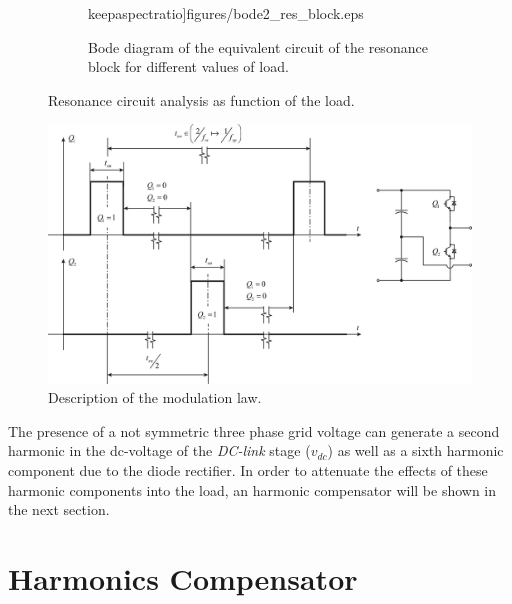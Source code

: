 \documentclass[11pt,a4paper,oneside]{book}
\numberwithin{equation}{section}
\theoremstyle{it}
\theoremstyle{definition}
\begin{document}
\begin{onehalfspace}
\begin{figure}[H]
\begin{subfigure}{0.45\textwidth}
		keepaspectratio]{figures/bode2_res_block.eps}
		\captionsetup{width=0.7\textwidth, font=footnotesize}	
		\caption{Bode diagram of the equivalent circuit of the resonance block for different values of load.}
		\label{bode_1}
	\end{subfigure}
	\captionsetup{width=0.5\textwidth, font=small}	
	\caption{Resonance circuit analysis as function of the load.}
	\label{}
\end{figure}
\begin{figure}[H]
	\centering
	\includegraphics[width = 475pt, angle = 0, 
	keepaspectratio]{figures/modulation_strategy.eps}
	\captionsetup{width=0.65\textwidth, font=small}	
	\caption{Description of the modulation law.}
	\label{modulation_strategy}
\end{figure}
The presence of a not symmetric three phase grid voltage can generate a second harmonic in the dc-voltage of the \textit{DC-link} stage ($v_{dc}$) as well as a sixth harmonic component due to the diode rectifier. In order to attenuate the effects of these harmonic components into the load, an harmonic compensator will be shown in the next section. 
\chapter{Harmonics Compensator}

\end{onehalfspace}
\end{document}
